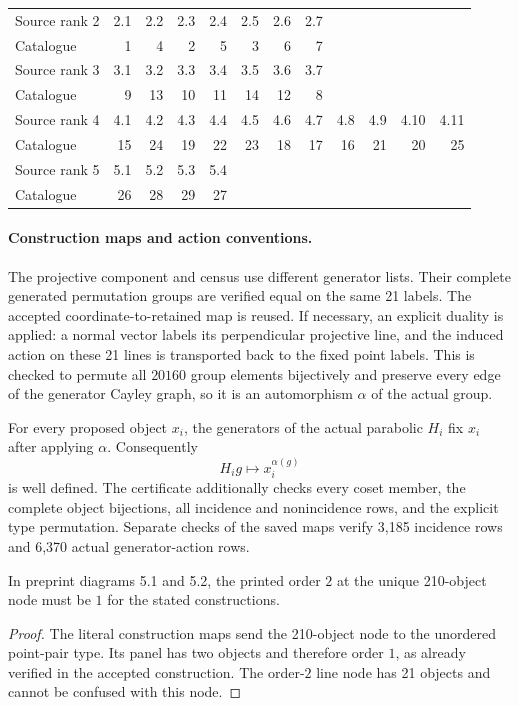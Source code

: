 \documentclass[10pt]{article}
\begin{document}
\begin{center}\small
\begin{tabular}{@{}lrrrrrrrrrrr@{}}\toprule
Source rank 2 &2.1&2.2&2.3&2.4&2.5&2.6&2.7\\
Catalogue &1&4&2&5&3&6&7\\\midrule
Source rank 3 &3.1&3.2&3.3&3.4&3.5&3.6&3.7\\
Catalogue &9&13&10&11&14&12&8\\\midrule
Source rank 4 &4.1&4.2&4.3&4.4&4.5&4.6&4.7&4.8&4.9&4.10&4.11\\
Catalogue &15&24&19&22&23&18&17&16&21&20&25\\\midrule
Source rank 5 &5.1&5.2&5.3&5.4\\
Catalogue &26&28&29&27\\\bottomrule
\end{tabular}
\end{center}

\paragraph{Construction maps and action conventions.}
The projective component and census use different generator lists.  Their
complete generated permutation groups are verified equal on the same 21
labels.  The accepted coordinate-to-retained map is reused.  If necessary,
an explicit duality is applied: a normal vector labels its perpendicular
projective line, and the induced action on these 21 lines is transported back
to the fixed point labels.  This is checked to permute all $20160$ group
elements bijectively and preserve every edge of the generator Cayley graph,
so it is an automorphism $\alpha$ of the actual group.

For every proposed object $x_i$, the generators of the actual parabolic $H_i$
fix $x_i$ after applying $\alpha$.  Consequently
\[
                  H_i g\longmapsto x_i^{\alpha(g)}
\]
is well defined.  The certificate additionally checks every coset member,
the complete object bijections, all incidence and nonincidence rows, and the
explicit type permutation.  Separate checks of the saved maps verify
3,185 incidence rows and 6,370 actual generator-action rows.

\begin{lemma}\label{errors}
In preprint diagrams 5.1 and 5.2, the printed order $2$ at the unique
210-object node must be $1$ for the stated constructions.
\end{lemma}
\begin{proof}
The literal construction maps send the 210-object node to the unordered
point-pair type.  Its panel has two objects and therefore order $1$, as already
verified in the accepted construction.  The order-$2$ line node has 21 objects
and cannot be confused with this node.

\end{proof}
\end{document}
